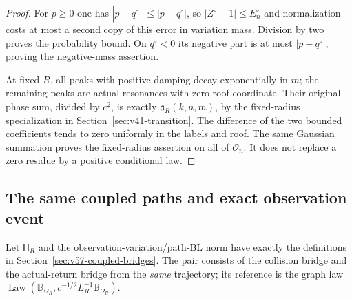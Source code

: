 \begin{proof}
For $p\ge0$ one has $|p-q_+^\circ|\le|p-q^\circ|$, so
$|Z^\circ-1|\le E_n^\circ$ and normalization costs at most a second
copy of this error in variation mass. Division by two proves the
probability bound. On $q^\circ<0$ its negative part is at most
$|p-q^\circ|$, proving the negative-mass assertion.

At fixed $R$, all peaks with positive damping decay exponentially
in $m$; the remaining peaks are actual resonances with zero roof
coordinate. Their original phase sum, divided by $c^2$, is exactly
$\mathfrak a_R(k,n,m)$, by the fixed-radius specialization in
Section~\ref{sec:v41-transition}. The difference of the two bounded
coefficients tends to zero uniformly in the labels and roof. The
same Gaussian summation proves the fixed-radius assertion on all of
$\mathcal O_n$. It does not replace a zero residue by a positive
conditional law.
\end{proof}

\subsection{The same coupled paths and exact observation event}
Let $\mathsf H_R$ and the observation-variation/path-BL norm have
exactly the definitions in Section~\ref{sec:v57-coupled-bridges}.
The pair consists of the collision bridge and the actual-return
bridge from the \emph{same} trajectory; its reference is the graph
law $\operatorname{Law}(\mathbb B_{\Omega_R},
 c^{-1/2}L_R^{-1}\mathbb B_{\Omega_R})$.

